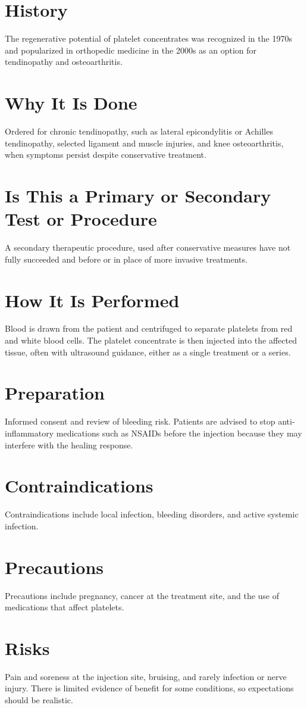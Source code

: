 \section*{History}
The regenerative potential of platelet concentrates was recognized in the 1970s and popularized in orthopedic medicine in the 2000s as an option for tendinopathy and osteoarthritis.
\section*{Why It Is Done}
Ordered for chronic tendinopathy, such as lateral epicondylitis or Achilles tendinopathy, selected ligament and muscle injuries, and knee osteoarthritis, when symptoms persist despite conservative treatment.
\section*{Is This a Primary or Secondary Test or Procedure}
A secondary therapeutic procedure, used after conservative measures have not fully succeeded and before or in place of more invasive treatments.
\section*{How It Is Performed}
Blood is drawn from the patient and centrifuged to separate platelets from red and white blood cells. The platelet concentrate is then injected into the affected tissue, often with ultrasound guidance, either as a single treatment or a series.
\section*{Preparation}
Informed consent and review of bleeding risk. Patients are advised to stop anti-inflammatory medications such as NSAIDs before the injection because they may interfere with the healing response.
\section*{Contraindications}
Contraindications include local infection, bleeding disorders, and active systemic infection.

\section*{Precautions}
Precautions include pregnancy, cancer at the treatment site, and the use of medications that affect platelets.

\section*{Risks}
Pain and soreness at the injection site, bruising, and rarely infection or nerve injury. There is limited evidence of benefit for some conditions, so expectations should be realistic.

